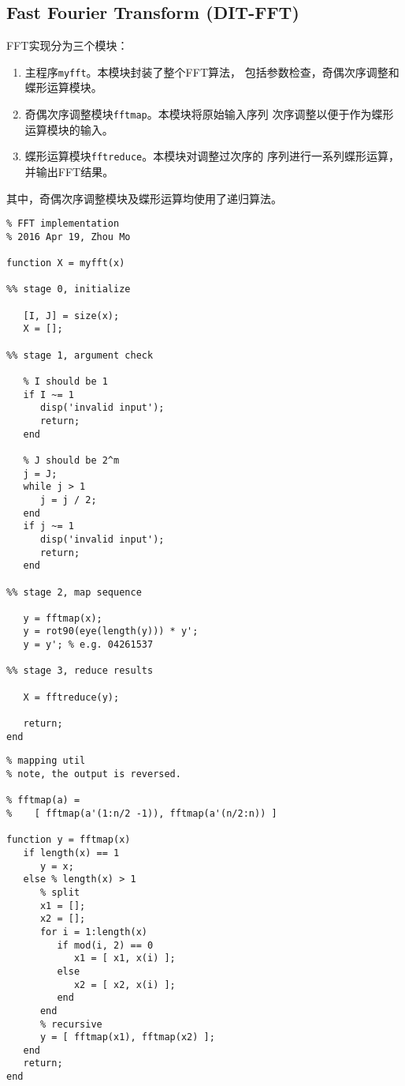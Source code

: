 \documentclass[12pt, a4paper]{article}
\begin{document}
\begin{CJK}{UTF8}{gkai}
\section{Fast Fourier Transform (DIT-FFT)}

FFT实现分为三个模块：
\begin{enumerate}
\item 主程序\verb|myfft|。本模块封装了整个FFT算法，
包括参数检查，奇偶次序调整和蝶形运算模块。
\item 奇偶次序调整模块\verb|fftmap|。本模块将原始输入序列
次序调整以便于作为蝶形运算模块的输入。
\item 蝶形运算模块\verb|fftreduce|。本模块对调整过次序的
序列进行一系列蝶形运算，并输出FFT结果。
\end{enumerate}
其中，奇偶次序调整模块及蝶形运算均使用了递归算法。
\begin{lstlisting}[caption={myfft.m}]
%!/usr/bin/octave
% FFT implementation
% 2016 Apr 19, Zhou Mo

function X = myfft(x)

%% stage 0, initialize

   [I, J] = size(x);
   X = [];

%% stage 1, argument check

   % I should be 1
   if I ~= 1
      disp('invalid input');
      return;
   end

   % J should be 2^m
   j = J;
   while j > 1
      j = j / 2;
   end
   if j ~= 1
      disp('invalid input');
      return;
   end

%% stage 2, map sequence

   y = fftmap(x);
   y = rot90(eye(length(y))) * y';
   y = y'; % e.g. 04261537

%% stage 3, reduce results

   X = fftreduce(y);
   
   return;
end
\end{lstlisting}

\begin{lstlisting}[caption={fftmap.m}]
% myfft internal module
% mapping util
% note, the output is reversed.

% fftmap(a) =
%    [ fftmap(a'(1:n/2 -1)), fftmap(a'(n/2:n)) ]

function y = fftmap(x)
   if length(x) == 1
      y = x;
   else % length(x) > 1
      % split
      x1 = [];
      x2 = [];
      for i = 1:length(x)
         if mod(i, 2) == 0
            x1 = [ x1, x(i) ];
         else
            x2 = [ x2, x(i) ];
         end
      end
      % recursive
      y = [ fftmap(x1), fftmap(x2) ];
   end
   return;
end
\end{lstlisting}


\end{CJK}
\end{document}
